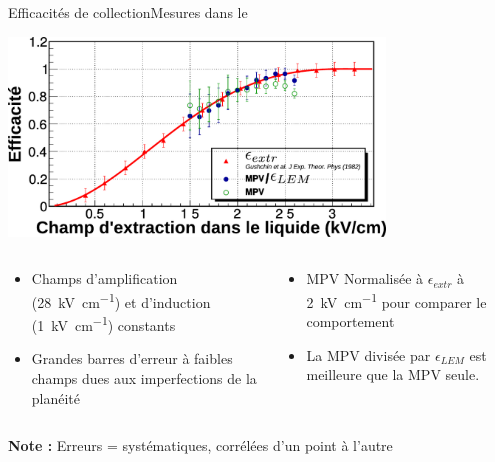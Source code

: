     \begin{frame}{Efficacités de collection}{Mesures dans le \TOO{}}
        \begin{scriptsize}
            \centering
            \includegraphics[width=0.75\textwidth]{./pictures/comp_311_eff.pdf}
            \vspace{0.2cm}
            \begin{columns}
                \begin{column}{0.5\textwidth}
                    \begin{itemize}
                        \item Champs d'amplification (\SI{28}{\kilo\volt\per\centi\meter}) et d'induction (\SI{1}{\kilo\volt\per\centi\meter}) constants
                        \item Grandes barres d'erreur à faibles champs dues aux imperfections de la planéité
                    \end{itemize}
                \end{column}
                \begin{column}{0.5\textwidth}
                    \begin{itemize}
                        \item MPV Normalisée à $\epsilon_{extr}$ à \SI{2}{\kilo\volt\per\centi\meter} pour comparer le comportement
                        \item La MPV divisée par  $\epsilon_{LEM}$ est meilleure que la MPV seule.
                    \end{itemize}
                \end{column}
            \end{columns}
            \vfill
            \textbf{Note :} Erreurs = systématiques, corrélées d'un point à l'autre
        \end{scriptsize}
    \end{frame}

